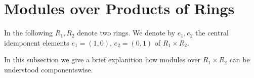 \section{Modules over Products of Rings}
\label{appendix: modules over products of rings}


\begin{conventions}
  In the following $R_1, R_2$ denote two rings.
  We denote by $e_1, e_2$ the central idemponent elements $e_1 = (1,0)$, $e_2 = (0,1)$ of $R_1 \times R_2$.
\end{conventions}


\begin{fluff}
  In this subsection we give a brief explanition how modules over $R_1 \times R_2$ can be understood componentswise.
\end{fluff}








